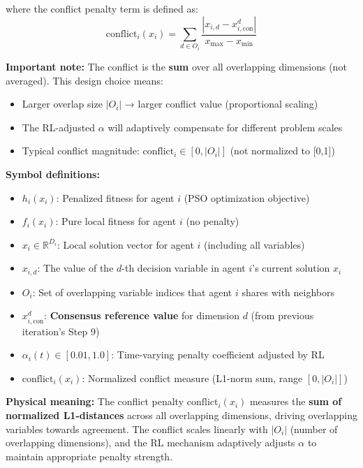 \documentclass[11pt,a4paper]{article}
\begin{document}
where the conflict penalty term is defined as:
\begin{equation}
\text{conflict}_i(x_i) = \sum_{d \in O_i} \frac{|x_{i,d} - x_{i,\text{con}}^d|}{x_{\max} - x_{\min}}
\end{equation}

\textbf{Important note:} The conflict is the \textbf{sum} over all overlapping dimensions (not averaged). This design choice means:
\begin{itemize}
    \item Larger overlap size $|O_i|$ → larger conflict value (proportional scaling)
    \item The RL-adjusted $\alpha$ will adaptively compensate for different problem scales
    \item Typical conflict magnitude: $\text{conflict}_i \in [0, |O_i|]$ (not normalized to [0,1])
\end{itemize}

\textbf{Symbol definitions:}
\begin{itemize}
    \item $h_i(x_i)$: Penalized fitness for agent $i$ (PSO optimization objective)
    \item $f_i(x_i)$: Pure local fitness for agent $i$ (no penalty)
    \item $x_i \in \mathbb{R}^{D_i}$: Local solution vector for agent $i$ (including all variables)
    \item $x_{i,d}$: The value of the $d$-th decision variable in agent $i$'s current solution $x_i$
    \item $O_i$: Set of overlapping variable indices that agent $i$ shares with neighbors
    \item $x_{i,\text{con}}^d$: \textbf{Consensus reference value} for dimension $d$ (from previous iteration's Step 9)
    \item $\alpha_i(t) \in [0.01, 1.0]$: Time-varying penalty coefficient adjusted by RL
    \item $\text{conflict}_i(x_i)$: Normalized conflict measure (L1-norm sum, range $[0, |O_i|]$)
\end{itemize}

\textbf{Physical meaning:} The conflict penalty $\text{conflict}_i(x_i)$ measures the \textbf{sum of normalized L1-distances} across all overlapping dimensions, driving overlapping variables towards agreement. The conflict scales linearly with $|O_i|$ (number of overlapping dimensions), and the RL mechanism adaptively adjusts $\alpha$ to maintain appropriate penalty strength.
\end{document}
